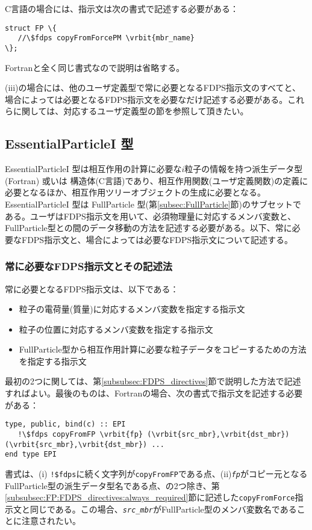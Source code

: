C言語の場合には、指示文は次の書式で記述する必要がある：
\begin{screen}
\begin{Verbatim}[commandchars=\\\{\}]
struct FP \{
   //\$fdps copyFromForcePM \vrbit{mbr_name}
\};
\end{Verbatim}
\end{screen}
Fortranと全く同じ書式なので説明は省略する。


(iii)の場合には、他のユーザ定義型で常に必要となるFDPS指示文のすべてと、場合によっては必要となるFDPS指示文を必要なだけ記述する必要がある。これらに関しては、対応するユーザ定義型の節を参照して頂きたい。

\subsection{EssentialParticleI 型}
\label{subsec:EssentialParticleI}
EssentialParticleI 型は相互作用の計算に必要な$i$粒子の情報を持つ派生データ型(Fortran) 或いは 構造体(C言語)であり、相互作用関数(ユーザ定義関数)の定義に必要となるほか、相互作用ツリーオブジェクトの生成に必要となる。EssentialParticleI 型は FullParticle 型(第\ref{subsec:FullParticle}節)のサブセットである。ユーザはFDPS指示文を用いて、必須物理量に対応するメンバ変数と、FullParticle型との間のデータ移動の方法を記述する必要がある。以下、常に必要なFDPS指示文と、場合によっては必要なFDPS指示文について記述する。

\subsubsection{常に必要なFDPS指示文とその記述法}
\label{subsubsec:EPI:FDPS_directives:always_required}
常に必要となるFDPS指示文は、以下である：
\begin{itemize}[leftmargin=*,itemsep=-1ex]
\item 粒子の電荷量(質量)に対応するメンバ変数を指定する指示文
\item 粒子の位置に対応するメンバ変数を指定する指示文
\item FullParticle型から相互作用計算に必要な粒子データをコピーするための方法を指定する指示文
\end{itemize}
最初の2つに関しては、第\ref{subsubsec:FDPS_directives}節で説明した方法で記述すればよい。最後のものは、Fortranの場合、次の書式で指示文を記述する必要がある：
\begin{screen}
\begin{Verbatim}[commandchars=\\\{\}]
type, public, bind(c) :: EPI
   !\$fdps copyFromFP \vrbit{fp} (\vrbit{src_mbr},\vrbit{dst_mbr}) (\vrbit{src_mbr},\vrbit{dst_mbr}) ...
end type EPI
\end{Verbatim}
\end{screen}
書式は、(i) \verb|!$fdps|に続く文字列が\texttt{copyFromFP}である点、(ii)\textit{\texttt{fp}}がコピー元となるFullParticle型の派生データ型名である点、の2つ除き、第\ref{subsubsec:FP:FDPS_directives:always_required}節に記述した\texttt{copyFromForce}指示文と同じである。この場合、\textit{\texttt{src\_mbr}}がFullParticle型のメンバ変数名であることに注意されたい。


